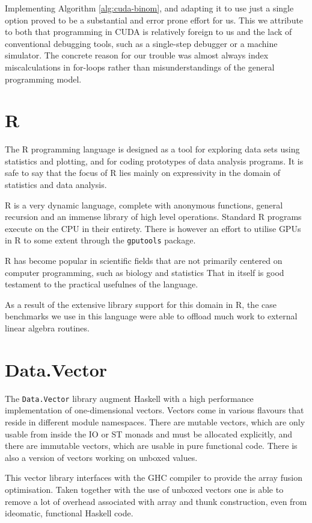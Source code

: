 Implementing Algorithm \ref{alg:cuda-binom}, and adapting it to use just a
single option proved to be a substantial and error prone effort for us. This we
attribute to both that programming in CUDA is relatively foreign to us and the
lack of conventional debugging tools, such as a single-step debugger or a
machine simulator. The concrete reason for our trouble was almost always index
miscalculations in for-loops rather than misunderstandings of the general
programming model.

\section{R}

The R programming language is designed as a tool for exploring data sets using
statistics and plotting, and for coding prototypes of data analysis programs.
It is safe to say that the focus of R lies mainly on expressivity in the domain
of statistics and data analysis.

R is a very dynamic language, complete with anonymous functions, general
recursion and an immense library of high level operations. Standard R programs
execute on the CPU in their entirety. There is however an effort to utilise
GPUs in R to some extent through the \texttt{gputools}
package\cite{crangputools}.

R has become popular in scientific fields that are not primarily centered on
computer programming, such as biology and statistics
That in itself is good testament to the practical usefulnes of the language.

As a result of the extensive library support for this domain in R, the case
benchmarks we use in this language were able to offload much work to external
linear algebra routines.

\section{Data.Vector}

The \texttt{Data.Vector} library augment Haskell with a high performance
implementation of one-dimensional vectors. Vectors come in various flavours
that reside in different module namespaces. There are mutable vectors, which
are only usable from inside the IO or ST monads and must be allocated
explicitly, and there are immutable vectors, which are usable in pure
functional code. There is also a version of vectors working on unboxed values.

This vector library interfaces with the GHC compiler to provide the array
fusion optimisation. Taken together with the use of unboxed vectors one is able
to remove a lot of overhead associated with array and thunk construction, even
from ideomatic, functional Haskell code. 

